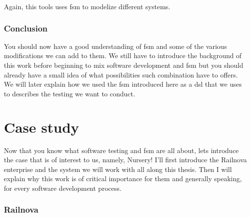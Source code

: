 \documentclass[12pt]{article}
\theoremstyle{definition}
\theoremstyle{definition}
\theoremstyle{remark}
\begin{document}
Again, this tools uses \gls{fsm} to modelize different systems.


\clearpage



\section{Conclusion}


You should now have a good understanding of \gls{fsm} and some of the various modifications we can add to them. We still have to introduce the background of this work before beginning to mix software development and \gls{fsm} but you should already have a small idea of what possibilities such combination have to offers. We will later explain how we used the \gls{fsm} introduced here as a \gls{dsl} that we uses to describes the testing we want to conduct.



\clearpage
\part{Case study}

Now that you know what software testing and \gls{fsm} are all about, lets introduce the case that is of interest to us, namely, Nursery! I'll first introduce the Railnova enterprise and the system we will work with all along this thesis. Then I will explain why this work is of critical importance for them and generally speaking, for every software development process.

\clearpage



\section{Railnova}
\end{document}
